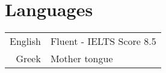 \documentclass[a4paper,10pt,twoside]{article}
\begin{document}
\section{Languages}

\begin{tabular}{rp{12cm}}
English & Fluent - IELTS Score 8.5\\
Greek & Mother tongue
\end{tabular}\\






\end{document}
